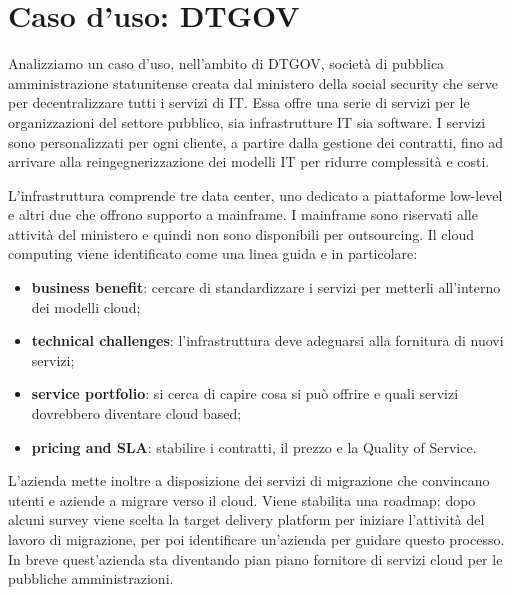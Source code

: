\section{Caso d'uso: DTGOV}
Analizziamo un caso d'uso, nell'ambito di DTGOV, società di pubblica amministrazione statunitense creata dal ministero della social security che serve per decentralizzare tutti i servizi di IT. Essa offre una serie di servizi per le organizzazioni del settore pubblico, sia infrastrutture IT sia software. I servizi sono personalizzati per ogni cliente, a partire dalla gestione dei contratti, fino ad arrivare alla reingegnerizzazione dei modelli IT per ridurre complessità e costi. 

L'infrastruttura comprende tre data center, uno dedicato a piattaforme low-level e altri due che offrono supporto a mainframe. I mainframe sono riservati alle attività del ministero e quindi non sono disponibili per outsourcing. Il cloud computing viene identificato come una linea guida e in particolare:
\begin{itemize}
    \item \textbf{business benefit}: cercare di standardizzare i servizi per metterli all'interno dei modelli cloud;
    \item \textbf{technical challenges}: l'infrastruttura deve adeguarsi alla fornitura di nuovi servizi;
    \item \textbf{service portfolio}: si cerca di capire cosa si può offrire e quali servizi dovrebbero diventare cloud based;
    \item \textbf{pricing and SLA}: stabilire i contratti, il prezzo e la Quality of Service.
\end{itemize}
L'azienda mette inoltre a disposizione dei servizi di migrazione che convincano utenti e aziende a migrare verso il cloud. Viene stabilita una roadmap: dopo alcuni survey viene scelta la target delivery platform per iniziare l'attività del lavoro di migrazione, per poi identificare un'azienda per guidare questo processo. In breve quest'azienda sta diventando pian piano fornitore di servizi cloud per le pubbliche amministrazioni.

